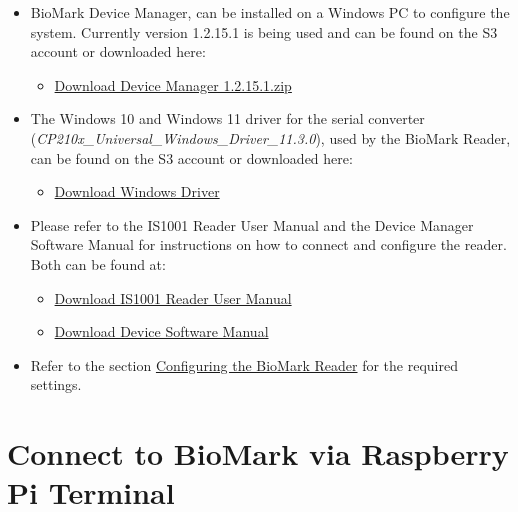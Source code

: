 \documentclass[
  letterpaper,
]{scrbook}
\providecommand{\tightlist}{%
  \setlength{\itemsep}{0pt}\setlength{\parskip}{0pt}}
\begin{document}
\begin{itemize}
\item
  BioMark Device Manager, can be installed on a Windows PC to configure
  the system. Currently version 1.2.15.1 is being used and can be found
  on the S3 account or downloaded here:

  \begin{itemize}
  \tightlist
  \item
    \href{_book/files/DeviceManagerStandalone_1.2.15.1.zip}{Download
    Device Manager 1.2.15.1.zip}
  \end{itemize}
\item
  The Windows 10 and Windows 11 driver for the serial converter
  (\emph{CP210x\_Universal\_Windows\_Driver\_11.3.0}), used by the
  BioMark Reader, can be found on the S3 account or downloaded here:

  \begin{itemize}
  \tightlist
  \item
    \href{_book/files/CP210x_Universal_Windows_Driver_11.3.0.zip}{Download
    Windows Driver}
  \end{itemize}
\item
  Please refer to the IS1001 Reader User Manual and the Device Manager
  Software Manual for instructions on how to connect and configure the
  reader. Both can be found at:

  \begin{itemize}
  \item
    \href{_book/files/IS1001_Reader_User_Manual_Rev_11.pdf}{Download
    IS1001 Reader User Manual}
  \item
    \href{_book/files/Device-Manager-Software-Manual-v1.1.pdf}{Download
    Device Software Manual}
  \end{itemize}
\item
  Refer to the section
  \hyperref[Configuringux5cux2520theux5cux2520BioMarkux5cux2520Reader]{Configuring
  the BioMark Reader} for the required settings.
\end{itemize}

\section{Connect to BioMark via Raspberry Pi
Terminal}\label{connect-to-biomark-via-raspberry-pi-terminal}
\end{document}
